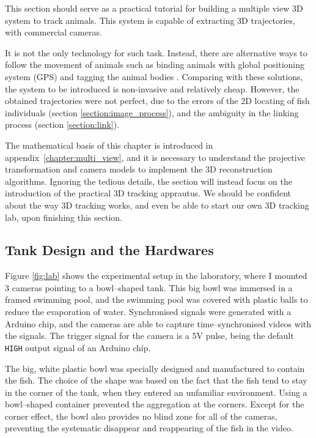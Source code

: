 \documentclass[11pt,twoside]{report}
\begin{document}
This section should serve as a practical tutorial for building a multiple view 3D system to track animals. This system is capable of extracting 3D trajectories, with commercial cameras.

It is not the only technology for such task. Instead, there are alternative ways to follow the movement of animals such as binding animals with global positioning system (GPS) \cite{nagy2010} and tagging the animal bodies \cite{jolles2017}. Comparing with these solutions, the system to be introduced is non-invasive and relatively cheap. However, the obtained trajectories were not perfect, due to the errors of the 2D locating of fish individuals (section \ref{section:image_process}), and the ambiguity in the linking process (section \ref{section:link}).

The mathematical basis of this chapter is introduced in appendix~\ref{chapter:multi_view}, and it is necessary to understand the projective transformation and camera models to implement the 3D reconstruction algorithms. Ignoring the tedious details, the section will instead focus on the introduction of the practical 3D tracking apprautus. We should be confident about the way 3D tracking works, and even be able to start our own 3D tracking lab, upon finishing this section.

\subsection{Tank Design and the Hardwares}
\label{section:system_3d}

Figure \ref{fig:lab} shows the experimental setup in the laboratory, where I mounted 3 cameras pointing to a bowl--shaped tank. This big bowl was immersed in a framed swimming pool, and the swimming pool was covered with plastic balls to reduce the evaporation of water. Synchronised signals were generated with a Arduino chip, and the cameras are able to capture time--synchronised videos with the signals. The trigger signal for the camera is a 5V pulse, being the default \texttt{HIGH} output signal of an Arduino chip.


The big, white plastic bowl was specially designed and manufactured to contain the fish. The choice of the shape was based on the fact that the fish tend to stay in the corner of the tank, when they entered an unfamiliar environment. Using a bowl--shaped container prevented the aggregation at the corners. Except for the corner effect, the bowl also provides no blind zone for all of the cameras, preventing the systematic disappear and reappearing of the fish in the video.
\end{document}
